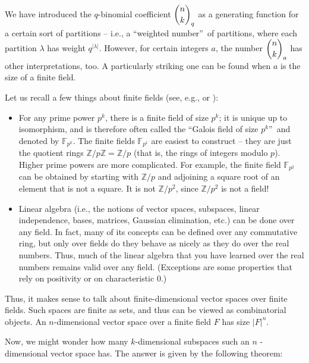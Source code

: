 We have introduced the $q$-binomial coefficient $\dbinom{n}{k}_{q}$ as a
generating function for a certain sort of partitions -- i.e., a
\textquotedblleft weighted number\textquotedblright\ of partitions, where each
partition $\lambda$ has weight $q^{\left\vert \lambda\right\vert }$. However,
for certain integers $a$, the number $\dbinom{n}{k}_{a}$ has other
interpretations, too. A particularly striking one can be found when $a$ is the
size of a finite field.

Let us recall a few things about finite fields (see, e.g., \cite[Chapter
5]{23wa} or \cite[Theorem 15.7.3]{Artin}):

\begin{itemize}
\item For any prime power $p^{k}$, there is a finite field of size $p^{k}$; it
is unique up to isomorphism, and is therefore often called the
\textquotedblleft Galois field of size $p^{k}$\textquotedblright\ and denoted
by $\mathbb{F}_{p^{k}}$. The finite fields $\mathbb{F}_{p^{1}}$ are easiest to
construct -- they are just the quotient rings $\mathbb{Z}/p\mathbb{Z}%
=\mathbb{Z}/p$ (that is, the rings of integers modulo $p$). Higher prime
powers are more complicated. For example, the finite field $\mathbb{F}_{p^{2}%
}$ can be obtained by starting with $\mathbb{Z}/p$ and adjoining a square root
of an element that is not a square. It is not $\mathbb{Z}/p^{2}$, since
$\mathbb{Z}/p^{2}$ is not a field!

\item Linear algebra (i.e., the notions of vector spaces, subspaces, linear
independence, bases, matrices, Gaussian elimination, etc.) can be done over
any field. In fact, many of its concepts can be defined over any commutative
ring, but only over fields do they behave as nicely as they do over the real
numbers. Thus, much of the linear algebra that you have learned over the real
numbers remains valid over any field. (Exceptions are some properties that
rely on positivity or on characteristic $0$.)
\end{itemize}

Thus, it makes sense to talk about finite-dimensional vector spaces over
finite fields. Such spaces are finite as sets, and thus can be viewed as
combinatorial objects. An $n$-dimensional vector space over a finite field $F$
has size $\left\vert F\right\vert ^{n}$.

Now, we might wonder how many $k$-dimensional subspaces such an $n$%
-dimensional vector space has. The answer is given by the following theorem:


